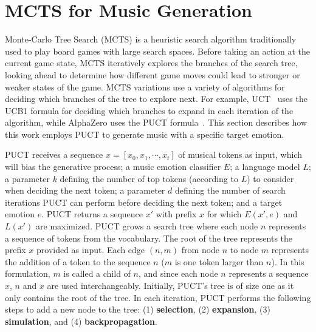 
\section{MCTS for Music Generation}
\label{sec:puct}

Monte-Carlo Tree Search (MCTS) is a heuristic search algorithm traditionally used to play board games with large search spaces. Before taking an action at the current game state, MCTS iteratively explores the branches of the search tree, looking ahead to determine how different game moves could lead to stronger or weaker states of the game. MCTS variations use a variety of algorithms for deciding which branches of the tree to explore next. For example, UCT~\cite{Kocsis2006} uses the UCB1 formula for deciding which branches to expand in each iteration of the algorithm, while AlphaZero uses the PUCT formula~\cite{rosin2011pucb}. This section describes how this work employs PUCT to generate music with a specific target emotion.

PUCT receives a sequence $x = [x_0, x_1, \cdots, x_t]$ of musical tokens as input, which will bias the generative process; a music emotion classifier $E$; a language model $L$; a parameter $k$ defining the number of top tokens (according to $L$) to consider when deciding the next token; a parameter $d$ defining the number of search iterations PUCT can perform before deciding the next token; and a target emotion $e$. PUCT returns a sequence $x'$ with prefix $x$ for which $E(x', e)$ and $L(x')$ are maximized. PUCT grows a search tree where each node $n$ represents a sequence of tokens from the vocabulary. The root of the tree represents the prefix $x$ provided as input. Each edge $(n, m)$ from node $n$ to node $m$ represents the addition of a token to the sequence $n$ ($m$ is one token larger than $n$). In this formulation, $m$ is called a child of $n$, and since each node $n$ represents a sequence $x$, $n$ and $x$ are used interchangeably. Initially, PUCT's tree is of size one as it only contains the root of the tree. In each iteration, PUCT performs the following steps to add a new node to the tree: (1) \textbf{selection}, (2) \textbf{expansion}, (3) \textbf{simulation}, and (4) \textbf{backpropagation}.

